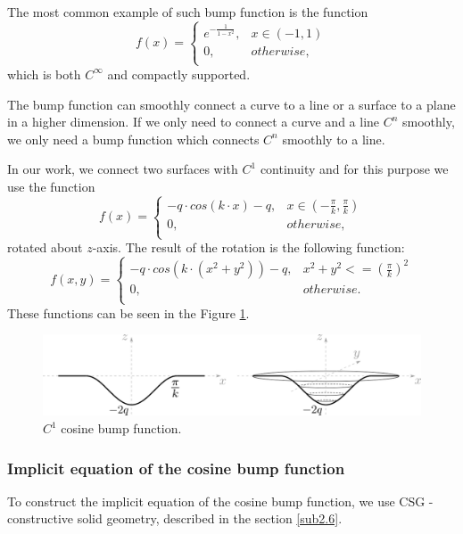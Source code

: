 The most common example of such bump function is the function 
$$f(x)= \left\{
    \begin{array}{ll}
        e^{-\frac{1}{1-x^2}}, & x \in (-1, 1) \\
          0, & otherwise,\\
    \end{array} 
    \right. $$
which is both $C^\infty$ and compactly supported.

The bump function can smoothly connect a curve to a line or a surface to a
plane in a higher dimension. If we only need to connect a curve and a line $C^n$ smoothly, 
we only need a bump function which connects $C^n$ smoothly to a line.

In our work, we connect two surfaces with $C^1$ continuity and for this purpose
we use the function
$$f(x)= \left\{
    \begin{array}{ll}
        -q \cdot cos(k \cdot x)-q, & x \in (-\frac{\pi}{k}, \frac{\pi}{k}) \\
        0, & otherwise,\\
    \end{array} 
    \right. $$
rotated about $z$-axis.
The result of the rotation is the following function:
$$f(x, y) = \left\{
    \begin{array}{ll}
        -q \cdot cos(k \cdot (x^2+y^2))-q, & x^2+y^2<=(\frac{\pi}{k})^2 \\
        0, & otherwise.\\
    \end{array} 
    \right. $$
These functions can be seen in the Figure \ref{img:21}.
\begin{figure}
    \centerline{\includegraphics[scale=0.5]{images/img21}}
    \caption[$C^1$ cosine bump function.]
    {$C^1$ cosine bump function.}
    \label{img:21}
\end{figure}

\subsubsection*{Implicit equation of the cosine bump function}
To construct the implicit equation of the cosine bump function, we use CSG
- constructive solid geometry, described in the section \ref{sub2.6}.

